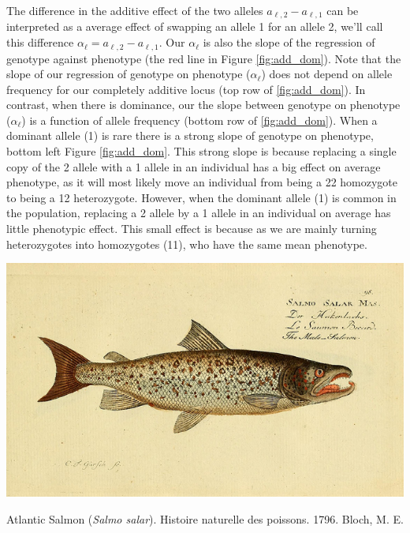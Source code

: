 The difference in the additive effect of the two alleles $a_{\ell, 2}-a_{\ell,
1}$ can be interpreted as a average effect of swapping an allele 1 for an
allele 2, we'll call this difference $\alpha_{\ell}=a_{\ell, 2}-a_{\ell, 1}$.
Our $\alpha_{\ell}$ is also the slope of the regression of genotype against
phenotype (the red line in Figure \ref{fig:add_dom}). Note that the slope of
our regression of genotype on phenotype ($\alpha_{\ell}$) does not depend on
allele frequency for our completely additive locus (top row of
\ref{fig:add_dom}). In contrast, when there is dominance, our the slope between
genotype on phenotype ($\alpha_{\ell}$) is a function of allele frequency
(bottom row of \ref{fig:add_dom}). When a dominant allele (1) is rare there is
a strong slope of genotype on phenotype, bottom left Figure \ref{fig:add_dom}.
This strong slope is because replacing a single copy of the 2 allele with a 1
allele in an individual has a big effect on average phenotype, as it will most
likely move an individual from being a 22 homozygote to being a 12
heterozygote. However, when the dominant allele (1) is common in the
population, replacing a 2 allele by a 1 allele in an individual on average has
little phenotypic effect. This small effect is because as we are mainly turning
heterozygotes into homozygotes (11), who have the same mean phenotype.  \\


\begin{marginfigure}
\begin{center}
\includegraphics[width=\textwidth]{illustration_images/Quant_gen/Salmon/6918368208_5353868a88_z.jpg}
\end{center}
\caption{Atlantic Salmon ({\it Salmo salar}). Histoire naturelle des poissons. 1796. Bloch, M. E.} \label{fig:Salmon}
\end{marginfigure}



